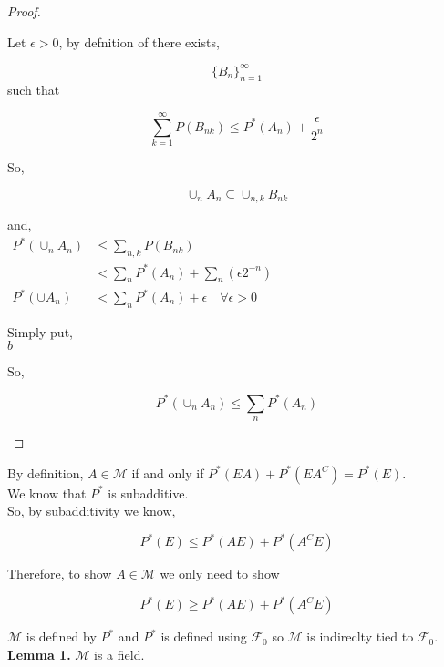 \documentclass[11pt,fleqn]{book} %
\begin{document}
\begin{proof}
\begin{enumerate}[label = (\roman*)]
		Let $\epsilon > 0$, by defnition of  there exists, 

		$$ \{B_n\}^\infty_{n=1}  $$ such that

		$$\displaystyle \sum^\infty_{k=1} P(B_{nk}) \leq P^*(A_n) + \frac{\epsilon}{2^n} $$

		So, 

		$$\cup_n A_n \subseteq \cup_{n,k} B_{nk} $$

		and,\\

		$\begin{aligned}
			P^*(\cup_n A_n) &\leq \displaystyle \sum_{n,k} P(B_{nk})\\ 
			&< \displaystyle \sum_n P^* (A_n) + \sum_n (\epsilon 2^{-n})\\
			P^*(\cup A_n) &< \sum_n P^* (A_n) + \epsilon \quad \forall \epsilon > 0
		\end{aligned}$

		Simply put, \\
		$ b$

		So, 

		$$P^*(\cup_n A_n) \leq \sum_n P^*(A_n) $$
 	\end{enumerate}
\end{proof}

By definition, $A \in \mathscr{M}$ if and only if $P^*(EA) + P^*(EA^C) = P^*(E)$. \\

We know that $P^*$ is subadditive. \\

So, by subadditivity we know, 

$$P^*(E) \leq P^*(AE) + P^*(A^C E) $$

Therefore, to show $A \in \mathscr{M}$ we only need to show 

$$P^*(E) \geq P^*(AE) + P^*(A^C E) $$


$\mathscr{M}$ is defined by $P^*$ and $P^*$ is defined using $\mathscr{F}_0$ so $\mathscr{M}$ is indireclty tied to $\mathscr{F}_0$.\\

\textbf{Lemma 1.} $\mathscr{M}$ is a field.
\end{document}
